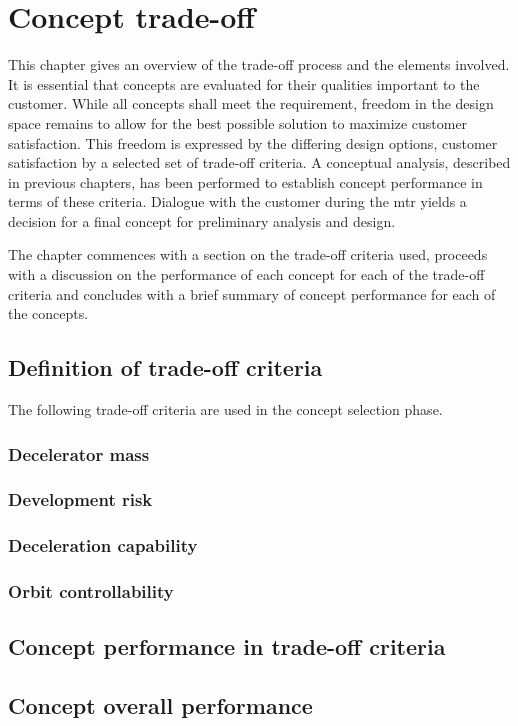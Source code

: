 \section{Concept trade-off}
\label{ch:tradeoff}
This chapter gives an overview of the trade-off process and the elements involved. It is essential that concepts are evaluated for their qualities important to the customer. While all concepts shall meet the requirement, freedom in the design space remains to allow for the best possible solution to maximize customer satisfaction. This freedom is expressed by the differing design options, customer satisfaction by a selected set of trade-off criteria. A conceptual analysis, described in previous chapters, has been performed to establish concept performance in terms of these criteria. Dialogue with the customer  during the \acrfull{mtr} yields a decision for a final concept for preliminary analysis and design.

The chapter commences with a section on the trade-off criteria used, proceeds with a discussion on the performance of each concept for each of the trade-off criteria and concludes with a brief summary of concept performance for each of the concepts.

\subsection{Definition of trade-off criteria}
The following trade-off criteria are used in the concept selection phase. 

\subsubsection{Decelerator mass}

\subsubsection{Development risk}

\subsubsection{Deceleration capability}

\subsubsection{Orbit controllability}

\subsection{Concept performance in trade-off criteria}

\subsection{Concept overall performance}
